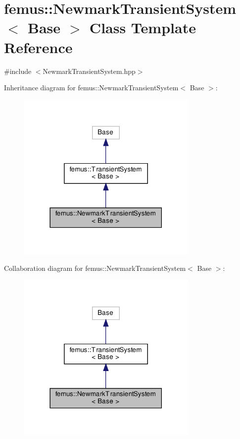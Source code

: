\hypertarget{classfemus_1_1_newmark_transient_system}{}\section{femus\+:\+:Newmark\+Transient\+System$<$ Base $>$ Class Template Reference}
\label{classfemus_1_1_newmark_transient_system}


{\ttfamily \#include $<$Newmark\+Transient\+System.\+hpp$>$}



Inheritance diagram for femus\+:\+:Newmark\+Transient\+System$<$ Base $>$\+:
\nopagebreak
\begin{figure}[H]
\begin{center}
\leavevmode
\includegraphics[width=249pt]{classfemus_1_1_newmark_transient_system__inherit__graph}
\end{center}
\end{figure}


Collaboration diagram for femus\+:\+:Newmark\+Transient\+System$<$ Base $>$\+:
\nopagebreak
\begin{figure}[H]
\begin{center}
\leavevmode
\includegraphics[width=249pt]{classfemus_1_1_newmark_transient_system__coll__graph}
\end{center}
\end{figure}
